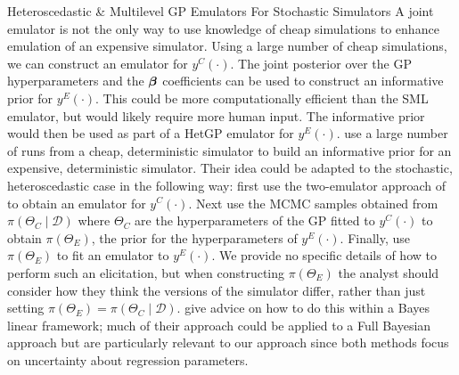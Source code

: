 \begin{chapter}{Heteroscedastic \& Multilevel GP Emulators For Stochastic Simulators\label{Ch:Hetsml}}
A joint emulator is not the only way to use knowledge of cheap simulations to enhance emulation of an expensive simulator. Using a large number of cheap simulations, we can construct an emulator for $y^C(\cdot)$. The joint posterior over the GP hyperparameters and the $\bm{\beta}$ coefficients can be used to construct an informative prior for $y^E(\cdot)$. This could be more computationally efficient than the SML emulator, but would likely require more human input. The informative prior would then be used as part of a HetGP emulator for $y^E(\cdot)$. \citet{Cumming2010} use a large number of runs from a cheap, deterministic simulator to build an informative prior for an expensive, deterministic simulator. Their idea could be adapted to the stochastic, heteroscedastic case in the following way: first use the two-emulator approach of \citet{Henderson09} to obtain an emulator for $y^C(\cdot)$. Next use the MCMC samples obtained from $\pi(\Theta_C \mid \mathcal{D})$ where $\Theta_C$ are the hyperparameters of the GP fitted to $y^C(\cdot)$ to obtain $\pi(\Theta_E)$, the prior for the hyperparameters of $y^E (\cdot)$. Finally, use $\pi(\Theta_E)$ to fit an emulator to $y^E (\cdot)$. We provide no specific details of how to perform such an elicitation, but when constructing $\pi(\Theta_E)$ the analyst should consider how they think the versions of the simulator differ, rather than just setting $\pi(\Theta_E) = \pi(\Theta_C \mid \mathcal{D})$. \citet{Cumming2010} give advice on how to do this within a Bayes linear framework; much of their approach could be applied to a Full Bayesian approach but are particularly relevant to our  approach since both methods focus on uncertainty about regression parameters.

\end{chapter}
